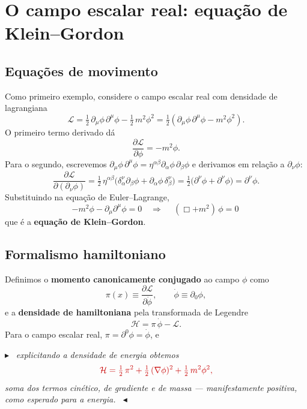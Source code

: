 \documentclass[12pt,a4paper]{article}
\newenvironment{revbox}%
  {\par\medskip\noindent\color{revred}\ensuremath{\blacktriangleright}\ \itshape}%
  {\ \upshape\ensuremath{\blacktriangleleft}\par\medskip}
\newcommand{\pt}[1]{\partial_{#1}}
\newcommand{\Lag}{\mathcal{L}}
\newcommand{\Ham}{\mathcal{H}}
\renewcommand{\d}{\partial}
\begin{document}
\section{O campo escalar real: equação de Klein--Gordon}

\subsection{Equações de movimento}

Como primeiro exemplo, considere o campo escalar real com densidade de
lagrangiana
\begin{equation}
  \Lag=\tfrac12\,\pt{\mu}\phi\,\d^{\mu}\phi-\tfrac12\,m^{2}\phi^{2}
     =\tfrac12\!\left(\pt{\mu}\phi\,\d^{\mu}\phi-m^{2}\phi^{2}\right).
\end{equation}
O primeiro termo derivado dá
\begin{equation}
  \frac{\d\Lag}{\d\phi}=-m^{2}\phi .
\end{equation}
Para o segundo, escrevemos $\pt{\mu}\phi\,\d^{\mu}\phi
=\eta^{\alpha\beta}\pt{\alpha}\phi\,\pt{\beta}\phi$ e derivamos em relação a
$\pt{\nu}\phi$:
\begin{equation}
  \frac{\d\Lag}{\d(\pt{\nu}\phi)}
  =\tfrac12\,\eta^{\alpha\beta}
   \bigl(\delta^{\nu}_{\alpha}\pt{\beta}\phi+\pt{\alpha}\phi\,\delta^{\nu}_{\beta}\bigr)
  =\tfrac12\bigl(\d^{\nu}\phi+\d^{\nu}\phi\bigr)=\d^{\nu}\phi .
\end{equation}
Substituindo na equação de Euler--Lagrange,
\begin{equation}
  -m^{2}\phi-\pt{\mu}\d^{\mu}\phi=0
  \quad\Longrightarrow\quad
  \boxed{\ (\Box+m^{2})\,\phi=0\ }
\end{equation}
que é a \textbf{equação de Klein--Gordon}.

\subsection{Formalismo hamiltoniano}

Definimos o \textbf{momento canonicamente conjugado} ao campo $\phi$ como
\begin{equation}
  \pi(x)\equiv\frac{\d\Lag}{\d\dot\phi},
  \qquad \dot\phi\equiv\pt{0}\phi,
\end{equation}
e a \textbf{densidade de hamiltoniana} pela transformada de Legendre
\begin{equation}
  \Ham=\pi\,\dot\phi-\Lag .
\end{equation}
Para o campo escalar real, $\pi=\d^{0}\phi=\dot\phi$, e
\begin{revbox}
explicitando a densidade de energia obtemos
\upshape
\begin{equation}
  \color{revred}
  \Ham=\tfrac12\,\pi^{2}+\tfrac12\,(\nabla\phi)^{2}+\tfrac12\,m^{2}\phi^{2},
\end{equation}
\itshape
soma dos termos cinético, de gradiente e de massa --- manifestamente
positiva, como esperado para a energia.
\end{revbox}
\end{document}
